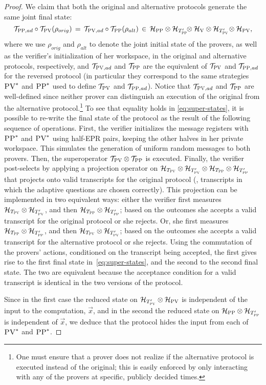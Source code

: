 \documentclass{toc}
\newcommand{\mH}{\mathcal{H}}
\newcommand{\mT}{\mathcal{T}}
\newcommand{\ver}{\textsc{V}}
\newcommand{\pv}{\textsc{PV}}
\newcommand{\pp}{\textsc{PP}}
\begin{document}
\begin{proof}
We claim that both the original and alternative protocols generate the same joint final state:
\begin{equation}\label{eq:super-states}
\mT_{\pp,ad}\circ\mT_\pv(\rho_{orig}) \,=\, \mT_{\pv,ad}\circ \mT_\pp(\rho_{alt}) \,\in\,  \mH_{\pp}\otimes \mH_{T'_{\pp}}\!\! \otimes \mH_\ver \otimes \mH_{T'_\pv}\! \otimes \mH_\pv,
\end{equation}
where we use $\rho_{orig}$ and $\rho_{alt}$ to denote the joint initial state
of the provers, as well as the verifier's initialization of her workspace, in
the original and alternative protocols, %
 respectively, and $\mT_{\pv,ad}$ and $\mT_\pp$ are the equivalent of $\mT_\pv$ and $\mT_{\pp,ad}$ for the reversed protocol (in particular they correspond to the same strategies $\pv^*$ and $\pp^*$ used to define $\mT_\pv$ and  $\mT_{\pp,ad}$). Notice that $\mT_{\pv,ad}$ and $\mT_\pp$ are well-defined since neither prover can distinguish an execution of the original 
from 
the alternative protocol.\footnote{One must ensure that a prover does not realize if the  alternative protocol is executed instead of the original; this is easily enforced by only interacting with any of the provers at specific, publicly decided times.}
To see that 
equality holds in \eqref{eq:super-states},
it is possible to re-write the final state of the protocol as the
  result of the following sequence of operations. First, the verifier
  initializes the message registers with $\pp^*$ and $\pv^*$ using half-EPR
  pairs, keeping the other halves in her private workspace. This simulates the
  generation of 
uniform
random messages to both provers. Then, the
  superoperator $\mT_\pv \otimes \mT_\pp$ is executed. Finally, the verifier
  post-selects by applying a projection operator on $\mH_{T_\pv} \otimes \mH_{T'_\pv} \otimes \mH_{T_\pp} \otimes \mH_{T'_\pp}$ 
that 
projects onto valid transcripts for the
original protocol (\ie, transcripts in which the adaptive questions are chosen
correctly). This projection can be implemented in two equivalent ways: either
  the verifier first measures $ \mH_{T_\pv} \otimes \mH_{T'_\pv}$, and then
  $\mH_{T_\pp} \otimes \mH_{T'_\pp}$; based on the outcomes she accepts a valid transcript for the
  original protocol or she rejects. Or, she first measures $ \mH_{T_\pp} \otimes \mH_{T'_\pp}$, and then
  $\mH_{T_\pv} \otimes \mH_{T'_\pv}$; based on the outcomes she accepts a
  valid transcript for the alternative protocol or she rejects. Using the
  commutation of the provers' actions, conditioned on the transcript being
  accepted, the first gives rise to the first final state
  in~\eqref{eq:super-states}, and the second to the second final state. The two are equivalent because the acceptance condition for a valid transcript is identical in the two versions of the protocol.


Since in the first case the reduced state on $\mH_{T'_{\pv}} \otimes \mH_\pv$ is independent of the input to the computation, $\vec{x}$, and in the second  the reduced state on $ \mH_\pp\otimes \mH_{T'_{\pp}} $ is independent of $\vec{x}$, we deduce that the protocol hides the input from each of $\pv^*$ and $\pp^*$. 
\end{proof}
\end{document}
